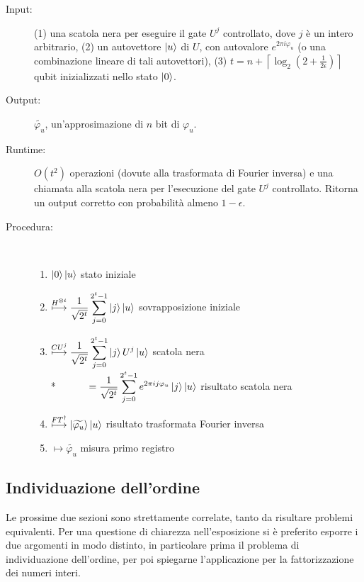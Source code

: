 \begin{algo}\*
\begin{description}
  \item [Input:] (1) una scatola nera per eseguire il gate $U^j$ controllato, dove $j$ è un intero arbitrario, (2) un autovettore $\ket{u}$ di $U$, con autovalore $e^{2 \pi i \varphi_u}$ (o una combinazione lineare di tali autovettori), (3) $t = n + \left\lceil \log_2 \left(2 + \frac{1}{2\epsilon} \right) \right\rceil$ qubit inizializzati nello stato $\ket{0}$.
  \item [Output:] $\widetilde{\varphi_u}$, un'approsimazione di $n$ bit di $\varphi_u$.
  \item [Runtime:] $O(t^2)$ operazioni (dovute alla trasformata di Fourier inversa) e una chiamata alla scatola nera per l'esecuzione del gate $U^j$ controllato. Ritorna un output corretto con probabilità almeno $1 - \epsilon$.
  \item [Procedura:] \ 
    \begin{enumerate}
     \item ${\displaystyle\ket{0}\ket{u}}$
     \hfill {\small stato iniziale}
     \item ${\displaystyle\stackrel{H^{\otimes t}}{\longmapsto} \frac{1}{\sqrt{2^t}} \sum_{j=0}^{2^t-1} \ket{j}\ket{u}}$
     \hfill {\small sovrapposizione iniziale}
     \item ${\displaystyle\stackrel{CU^j}{\longmapsto} \frac{1}{\sqrt{2^t}} \sum_{j=0}^{2^t-1} \ket{j} U^j \ket{u}}$
     \hfill {\small scatola nera} \\*
     \ \ ${\displaystyle\quad\quad = \frac{1}{\sqrt{2^t}} \sum_{j=0}^{2^t-1} e^{2 \pi i j \varphi_u} \ket{j} \ket{u}}$
     \hfill {\small risultato scatola nera}
     \item ${\displaystyle\stackrel{FT^\dag}{\longmapsto} \ket{\widetilde{\varphi_u}} \ket{u}}$
     \hfill {\small risultato trasformata Fourier inversa}
     \item ${\displaystyle\longmapsto \widetilde{\varphi_u}}$
     \hfill {\small misura primo registro}
    \end{enumerate}
 \end{description}
\end{algo}

\subsection{Individuazione dell'ordine}\label{sec:alg_ordine}
Le prossime due sezioni sono strettamente correlate, tanto da risultare problemi equivalenti. 
Per una questione di chiarezza nell'esposizione si è preferito esporre i due argomenti in modo distinto, in particolare prima il problema di individuazione dell'ordine, per poi spiegarne l'applicazione per la fattorizzazione dei numeri interi.

